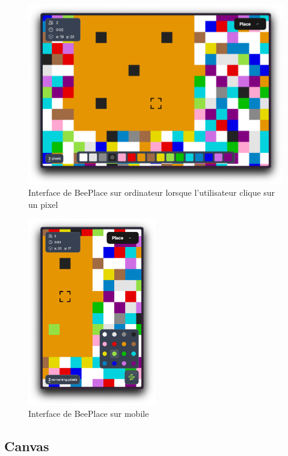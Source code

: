 \begin{figure}[H]
  \centering
  \includegraphics[width=1\textwidth]{./assets/figures/screenshot-app-v2-2.png}
  \caption{Interface de BeePlace sur ordinateur lorsque l'utilisateur clique sur un pixel}
  \label{fig:screenshot-app-2}
\end{figure}

\begin{figure}[H]
  \centering
  \includegraphics[width=0.5\textwidth]{./assets/figures/screenshot-app-v2-3.png}
  \caption{Interface de BeePlace sur mobile}
  \label{fig:screenshot-app-3}
\end{figure}

\subsection{Canvas}

